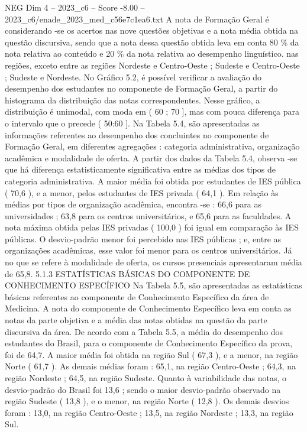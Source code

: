 \begin{textsample}{NEG Dim 4 – 2023\_c6 – Score -8.00 – 2023\_c6/enade\_2023\_med\_c56e7c1ea6.txt}
A nota de Formação Geral é considerando -se os acertos nas nove questões objetivas e a nota média obtida na questão discursiva, sendo que a nota dessa questão obtida leva em conta 80 \% da nota relativa ao conteúdo e 20 \% da nota relativa ao desempenho linguístico. nas regiões, exceto entre as regiões Nordeste e Centro-Oeste ; Sudeste e Centro-Oeste ; Sudeste e Nordeste.
No Gráfico 5.2, é possível verificar a avaliação do desempenho dos estudantes no componente de Formação Geral, a partir do histograma da distribuição das notas correspondentes.
Nesse gráfico, a distribuição é unimodal, com moda em ( 60 ; 70 ], mas com pouca diferença para o intervalo que o precede ( 50:60 ].
Na Tabela 5.4, são apresentadas as informações referentes ao desempenho dos concluintes no componente de Formação Geral, em diferentes agregações : categoria administrativa, organização acadêmica e modalidade de oferta.
A partir dos dados da Tabela 5.4, observa -se que há diferença estatisticamente significativa entre as médias dos tipos de categoria administrativa.
A maior média foi obtida por estudantes de IES pública ( 70,6 ), e a menor, pelos estudantes de IES privada ( 64,1 ).
Em relação às médias por tipos de organização acadêmica, encontra -se : 66,6 para as universidades ; 63,8 para os centros universitários, e 65,6 para as faculdades.
A nota máxima obtida pelas IES privadas ( 100,0 ) foi igual em comparação às IES públicas.
O desvio-padrão menor foi percebido nas IES públicas ; e, entre as organizações acadêmicas, esse valor foi menor para os centros universitários.
Já no que se refere à modalidade de oferta, os cursos presenciais apresentaram média de 65,8. 5.1.3 ESTATÍSTICAS BÁSICAS DO COMPONENTE DE CONHECIMENTO ESPECÍFICO Na Tabela 5.5, são apresentadas as estatísticas básicas referentes ao componente de Conhecimento Específico da área de Medicina.
A nota do componente de Conhecimento Específico leva em conta as notas da parte objetiva e a média das notas obtidas na questão da parte discursiva da área.
De acordo com a Tabela 5.5, a média do desempenho dos estudantes do Brasil, para o componente de Conhecimento Específico da prova, foi de 64,7.
A maior média foi obtida na região Sul ( 67,3 ), e a menor, na região Norte ( 61,7 ).
As demais médias foram : 65,1, na região Centro-Oeste ; 64,3, na região Nordeste ; 64,5, na região Sudeste.
Quanto à variabilidade das notas, o desvio-padrão do Brasil foi 13,6 ; sendo o maior desvio-padrão observado na região Sudeste ( 13,8 ), e o menor, na região Norte ( 12,8 ).
Os demais desvios foram : 13,0, na região Centro-Oeste ; 13,5, na região Nordeste ; 13,3, na região Sul.

\end{textsample}
